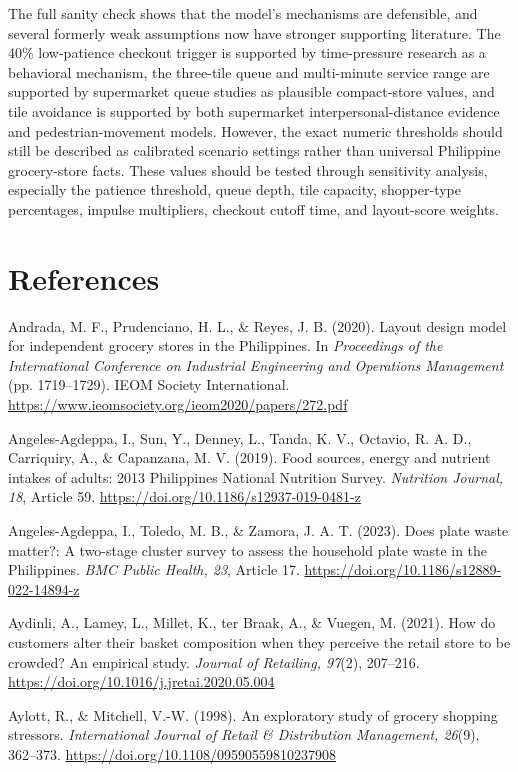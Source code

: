 \documentclass[12pt]{article}
\newcommand{\aparef}[1]{\par\noindent\hangindent=0.5in\hangafter=1 #1\par}
\begin{document}
The full sanity check shows that the model's mechanisms are defensible, and several formerly weak assumptions now have stronger supporting literature. The 40\% low-patience checkout trigger is supported by time-pressure research as a behavioral mechanism, the three-tile queue and multi-minute service range are supported by supermarket queue studies as plausible compact-store values, and tile avoidance is supported by both supermarket interpersonal-distance evidence and pedestrian-movement models. However, the exact numeric thresholds should still be described as calibrated scenario settings rather than universal Philippine grocery-store facts. These values should be tested through sensitivity analysis, especially the patience threshold, queue depth, tile capacity, shopper-type percentages, impulse multipliers, checkout cutoff time, and layout-score weights.

\section*{References}

\aparef{Andrada, M. F., Prudenciano, H. L., \& Reyes, J. B. (2020). Layout design model for independent grocery stores in the Philippines. In \textit{Proceedings of the International Conference on Industrial Engineering and Operations Management} (pp. 1719--1729). IEOM Society International. \url{https://www.ieomsociety.org/ieom2020/papers/272.pdf}}

\aparef{Angeles-Agdeppa, I., Sun, Y., Denney, L., Tanda, K. V., Octavio, R. A. D., Carriquiry, A., \& Capanzana, M. V. (2019). Food sources, energy and nutrient intakes of adults: 2013 Philippines National Nutrition Survey. \textit{Nutrition Journal, 18}, Article 59. \url{https://doi.org/10.1186/s12937-019-0481-z}}

\aparef{Angeles-Agdeppa, I., Toledo, M. B., \& Zamora, J. A. T. (2023). Does plate waste matter?: A two-stage cluster survey to assess the household plate waste in the Philippines. \textit{BMC Public Health, 23}, Article 17. \url{https://doi.org/10.1186/s12889-022-14894-z}}

\aparef{Aydinli, A., Lamey, L., Millet, K., ter Braak, A., \& Vuegen, M. (2021). How do customers alter their basket composition when they perceive the retail store to be crowded? An empirical study. \textit{Journal of Retailing, 97}(2), 207--216. \url{https://doi.org/10.1016/j.jretai.2020.05.004}}

\aparef{Aylott, R., \& Mitchell, V.-W. (1998). An exploratory study of grocery shopping stressors. \textit{International Journal of Retail \& Distribution Management, 26}(9), 362--373. \url{https://doi.org/10.1108/09590559810237908}}
\end{document}
